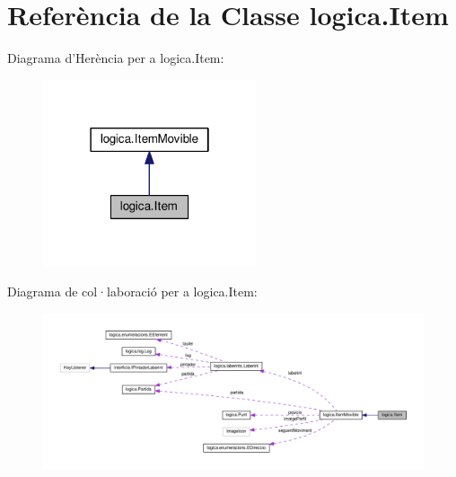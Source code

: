 \hypertarget{classlogica_1_1_item}{\section{Referència de la Classe logica.\+Item}
\label{classlogica_1_1_item}
}


Diagrama d'Herència per a logica.\+Item\+:\nopagebreak
\begin{figure}[H]
\begin{center}
\leavevmode
\includegraphics[width=178pt]{classlogica_1_1_item__inherit__graph}
\end{center}
\end{figure}


Diagrama de col·laboració per a logica.\+Item\+:\nopagebreak
\begin{figure}[H]
\begin{center}
\leavevmode
\includegraphics[width=350pt]{classlogica_1_1_item__coll__graph}
\end{center}
\end{figure}
